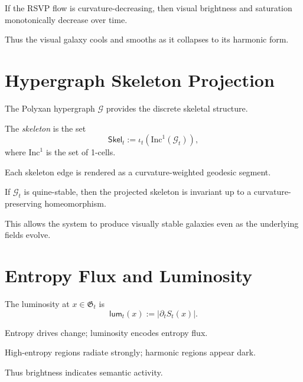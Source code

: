\begin{theorem}
If the RSVP flow is curvature-decreasing, then visual brightness and
saturation monotonically decrease over time.
\end{theorem}

Thus the visual galaxy cools and smooths as it collapses to its harmonic form.


\section{Hypergraph Skeleton Projection}
\label{sec:57:skeleton}

The Polyxan hypergraph $\mathcal{G}$ provides the discrete skeletal structure.

\begin{definition}
The \emph{skeleton} is the set
\[
\mathsf{Skel}_t := \iota_t(\mathrm{Inc}^1(\mathcal{G}_t)),
\]
where $\mathrm{Inc}^1$ is the set of 1-cells.
\end{definition}

Each skeleton edge is rendered as a curvature-weighted geodesic segment.

\begin{theorem}
If $\mathcal{G}_t$ is quine-stable, then the projected skeleton is invariant
up to a curvature-preserving homeomorphism.
\end{theorem}

This allows the system to produce visually stable galaxies even as the
underlying fields evolve.


\section{Entropy Flux and Luminosity}
\label{sec:57:entropy}

\begin{definition}
The luminosity at $x\in\mathfrak{G}_t$ is
\[
\mathsf{lum}_t(x) := |\partial_t S_t(x)|.
\]
\end{definition}

Entropy drives change; luminosity encodes entropy flux.

\begin{theorem}
High-entropy regions radiate strongly; harmonic regions appear dark.
\end{theorem}

Thus brightness indicates semantic activity.


